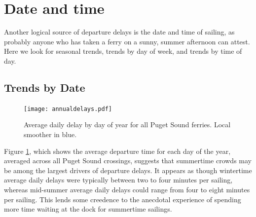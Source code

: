 \documentclass[11pt, letterpaper]{article}
\begin{document}
%


\section*{Date and time}

Another logical source of departure delays is the date and time of sailing, as probably anyone who has taken a ferry on a sunny, summer afternoon can attest. Here we look for seasonal trends, trends by day of week, and trends by time of day.

\subsection*{Trends by Date}

\begin{figure}[htbp]
\begin{center}
\texttt{[image: annualdelays.pdf]}
\caption{Average daily delay by day of year for all Puget Sound ferries. Local smoother in blue.}
\label{annual}
\end{center}
\end{figure}

Figure \ref{annual}, which shows the average departure time for each day of the year, averaged across all Puget Sound crossings, suggests that summertime crowds may be among the largest drivers of departure delays. It appears as though wintertime average daily delays were typically between two to four minutes per sailing, whereas mid-summer average daily delays could range from four to eight minutes per sailing. This lends some creedence to the anecdotal experience of spending more time waiting at the dock for summertime sailings.
\end{document}
